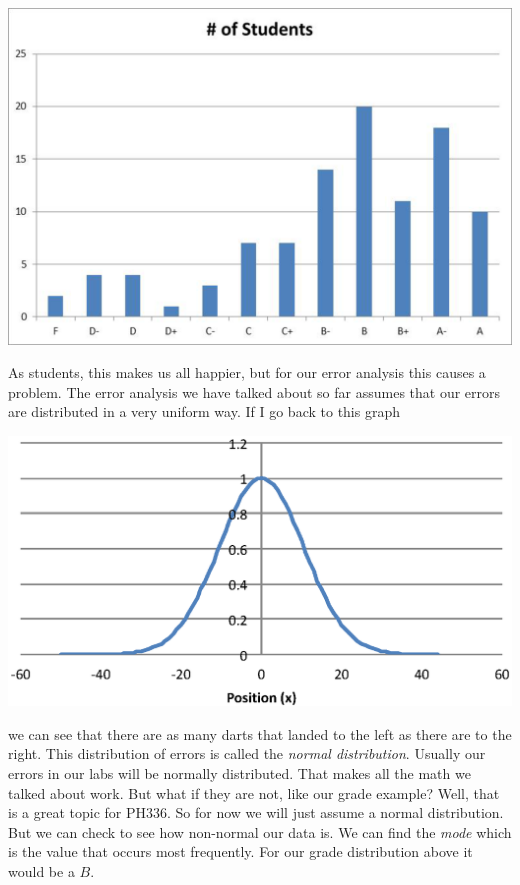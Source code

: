 \documentclass[twoside,11pt,ShortChapTitles]{BYUTextbook}
\begin{document}
\begin{center}
\includegraphics[scale=0.5]{Lab2_figs/hist_few.eps}
\end{center}

As students, this makes us all
happier, but for our error analysis this causes a problem. The error
analysis we have talked about so far assumes that our errors are distributed
in a very uniform way. If I go back to this graph

\begin{center}
\includegraphics[scale=0.5]{Lab2_figs/hist_dart.eps}
\end{center}

we can see that there are as many
darts that landed to the left as there are to the right. This distribution
of errors is called the \emph{normal distribution}. Usually our errors in
our labs will be normally distributed. That makes all the math we talked
about work. But what if they are not, like our grade example? Well, that is
a great topic for PH336. So for now we will just assume a normal
distribution. But we can check to see how non-normal our data is. We can
find the \emph{mode} which is the value that occurs most frequently. For our
grade distribution above it would be a $B.$
\end{document}
